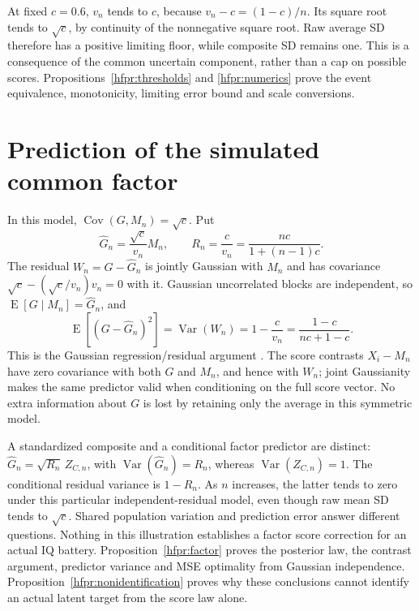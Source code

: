 At fixed \(c=0.6\), \(v_n\) tends to \(c\), because
\(v_n-c=(1-c)/n\). Its square root tends to \(\sqrt c\), by continuity
of the nonnegative square root. Raw average SD therefore has a positive
limiting floor, while composite SD remains one. This is a consequence of
the common uncertain component, rather than a cap on possible scores.
Propositions~\ref{hfpr:thresholds} and \ref{hfpr:numerics} prove the
event equivalence, monotonicity, limiting error bound and scale conversions.

\section{Prediction of the simulated common factor}
In this model, \(\operatorname{Cov}(G,M_n)=\sqrt c\). Put
\begin{equation}
 \widehat G_n=\frac{\sqrt c}{v_n}M_n,
 \qquad R_n=\frac{c}{v_n}
          =\frac{nc}{1+(n-1)c}.
 \label{eq:hf-predictor}
\end{equation}
The residual \(W_n=G-\widehat G_n\) is jointly Gaussian with \(M_n\)
and has covariance
\(\sqrt c-(\sqrt c/v_n)v_n=0\) with it. Gaussian uncorrelated blocks
are independent, so \(\operatorname E[G\mid M_n]=\widehat G_n\), and
\begin{equation}
 \operatorname E[(G-\widehat G_n)^2]
 =\operatorname{Var}(W_n)
 =1-\frac{c}{v_n}
 =\frac{1-c}{nc+1-c}.
 \label{eq:hf-mse}
\end{equation}
This is the Gaussian regression/residual argument
\citep[Theorems 3.5.1--3.5.2]{gallager2013}. The score contrasts
\(X_i-M_n\) have zero covariance with both \(G\) and \(M_n\), and
hence with \(W_n\); joint Gaussianity makes the same predictor valid
when conditioning on the full score vector. No extra information about
\(G\) is lost by retaining only the average in this symmetric model.

A standardized composite and a conditional factor predictor are distinct:
\(\widehat G_n=\sqrt{R_n}\,Z_{C,n}\), with
\(\operatorname{Var}(\widehat G_n)=R_n\), whereas
\(\operatorname{Var}(Z_{C,n})=1\). The conditional residual variance is
\(1-R_n\). As \(n\) increases, the latter tends to zero under this
particular independent-residual model, even though raw mean SD tends to
\(\sqrt c\). Shared population variation and prediction error answer
different questions. Nothing in this illustration establishes a factor
score correction for an actual IQ battery.
Proposition~\ref{hfpr:factor} proves the posterior law, the contrast
argument, predictor variance and MSE optimality from Gaussian independence.
Proposition~\ref{hfpr:nonidentification} proves why these conclusions
cannot identify an actual latent target from the score law alone.




